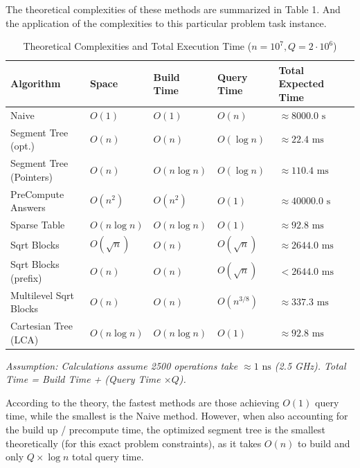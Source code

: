 \documentclass[a4paper,UKenglish,cleveref,thm-restate]{lipics-v2021}
\begin{document}
The theoretical complexities of these methods are summarized in Table 1. And the application of the complexities to this particular problem task instance.

\begin{table}[h]
\centering
\caption{Theoretical Complexities and Total Execution Time ($n=10^7, Q=2 \cdot 10^6$)}
\label{tab:theoretical_complexities}
\begin{tabular}{lllll}
\toprule
\textbf{Algorithm} & \textbf{Space} & \textbf{Build Time} & \textbf{Query Time} & \textbf{Total Expected Time} \\ \midrule
Naive & $O(1)$ & $O(1)$ & $O(n)$ & $\approx 8000.0\text{ s}$ \\
Segment Tree (opt.) & $O(n)$ & $O(n)$ & $O(\log n)$ & $\approx 22.4\text{ ms}$ \\
Segment Tree (Pointers) & $O(n)$ & $O(n \log n)$ & $O(\log n)$ & $\approx 110.4\text{ ms}$ \\
PreCompute Answers & $O(n^2)$ & $O(n^2)$ & $O(1)$ & $\approx 40000.0\text{ s}$ \\
Sparse Table & $O(n \log n)$ & $O(n \log n)$ & $O(1)$ & $\approx 92.8 \text{ ms}$ \\
Sqrt Blocks & $O(\sqrt{n})$ & $O(n)$ & $O(\sqrt{n})$ & $\approx 2644.0\text{ ms}$ \\
Sqrt Blocks (prefix)  & $O(n)$ & $O(n)$ & $O(\sqrt{n})$ & $< 2644.0\text{ ms}$ \\
Multilevel Sqrt Blocks  & $O(n)$ & $O(n)$ & $O(n^{3/8})$ & $\approx 337.3\text{ ms}$ \\
Cartesian Tree (LCA) & $O(n \log n)$ & $O(n \log n)$ & $O(1)$ & $\approx 92.8\text{ ms}$ \\ \bottomrule
\end{tabular}
\begin{flushleft}
\small \textit{Assumption: Calculations assume 2500 operations take $\approx 1\text{ ns}$ (2.5 GHz). Total Time = Build Time + (Query Time $\times Q$).}
\end{flushleft}
\end{table}

According to the theory, the fastest methods are those achieving $O(1)$ query time, while the smallest is the Naive method. However, when also accounting for the build up / precompute time, the optimized segment tree is the smallest theoretically (for this exact problem constraints), as it takes $O(n)$ to build and only $Q \times \log n$ total query time.
\end{document}
